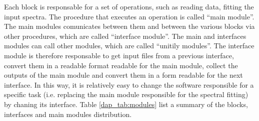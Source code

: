 \documentclass[11pt]{book}
\begin{document}
Each block is responsable for a set of operations, such as reading
data, fitting the input spectra. The procedure that executes an
operation is called ``main module''. The main modules comunicates
between them and between the various blocks via other procedures,
which are called ``interface module''. The main and interfaces modules
can call other modules, which are called ``unitily modules''. The
interface module is therefore responsable to get input files from a
previous interface, convert them in a readable format readable for the
main module, collect the outputs of the main module and convert them
in a form readable for the next interface. In this way, it is
relatively easy to change the software responsible for a specific task
(i.e. replacing the main module responsible for the spectral fitting)
by chaning its interface.  Table \ref{dap_tab:modules} list a summary
of the blocks, interfaces and main modules distribution.
\end{document}
